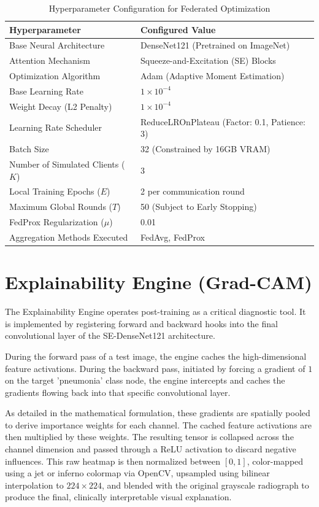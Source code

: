 \documentclass[12pt,a4paper]{report}
\begin{document}
\begin{table}[H]
\centering
\caption{Hyperparameter Configuration for Federated Optimization}
\label{tab:training_config}
\begin{tabular}{p{5.5cm}p{6.5cm}}
\toprule
\textbf{Hyperparameter} & \textbf{Configured Value} \\
\midrule
Base Neural Architecture & DenseNet121 (Pretrained on ImageNet) \\
Attention Mechanism & Squeeze-and-Excitation (SE) Blocks \\
Optimization Algorithm & Adam (Adaptive Moment Estimation) \\
Base Learning Rate & $1 \times 10^{-4}$ \\
Weight Decay (L2 Penalty) & $1 \times 10^{-4}$ \\
Learning Rate Scheduler & ReduceLROnPlateau (Factor: 0.1, Patience: 3) \\
Batch Size & 32 (Constrained by 16GB VRAM) \\
Number of Simulated Clients ($K$) & 3 \\
Local Training Epochs ($E$) & 2 per communication round \\
Maximum Global Rounds ($T$) & 50 (Subject to Early Stopping) \\
FedProx Regularization ($\mu$) & 0.01 \\
Aggregation Methods Executed & FedAvg, FedProx \\
\bottomrule
\end{tabular}
\end{table}

\section{Explainability Engine (Grad-CAM)}

The Explainability Engine operates post-training as a critical diagnostic tool. It is implemented by registering forward and backward hooks into the final convolutional layer of the SE-DenseNet121 architecture. 

During the forward pass of a test image, the engine caches the high-dimensional feature activations. During the backward pass, initiated by forcing a gradient of $1$ on the target 'pneumonia' class node, the engine intercepts and caches the gradients flowing back into that specific convolutional layer. 

As detailed in the mathematical formulation, these gradients are spatially pooled to derive importance weights for each channel. The cached feature activations are then multiplied by these weights. The resulting tensor is collapsed across the channel dimension and passed through a ReLU activation to discard negative influences. This raw heatmap is then normalized between $[0, 1]$, color-mapped using a jet or inferno colormap via OpenCV, upsampled using bilinear interpolation to $224 \times 224$, and blended with the original grayscale radiograph to produce the final, clinically interpretable visual explanation.
\end{document}
